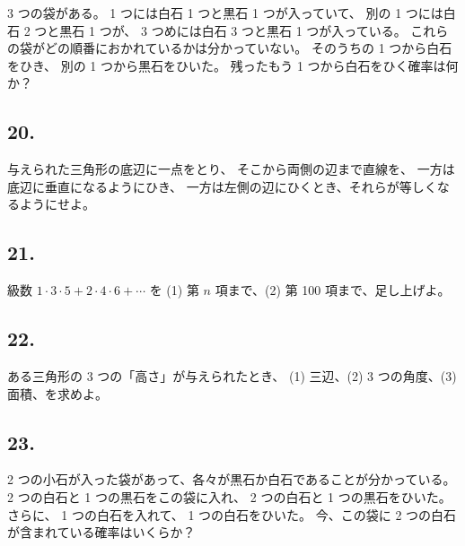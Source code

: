  3 つの袋がある。 1 つには白石 1 つと黒石 1 つが入っていて、
別の 1 つには白石 2 つと黒石 1 つが、
 3 つめには白石 3 つと黒石 1 つが入っている。
これらの袋がどの順番におかれているかは分かっていない。
そのうちの 1 つから白石をひき、
別の 1 つから黒石をひいた。
残ったもう 1 つから白石をひく確率は何か？

\subsection*{20.}

与えられた三角形の底辺に一点をとり、
そこから両側の辺まで直線を、
一方は底辺に垂直になるようにひき、
一方は左側の辺にひくとき、それらが等しくなるようにせよ。

\begin{flushright}
[5/88]
\end{flushright}

\subsection*{21.}

級数
$1 \cdot 3 \cdot 5 + 2 \cdot 4 \cdot 6 + \cdots$
を (1) 第 $n$ 項まで、(2) 第 100 項まで、足し上げよ。

\begin{flushright}
[7/4/89]
\end{flushright}

\subsection*{22.}

ある三角形の 3 つの「高さ」が与えられたとき、
(1) 三辺、(2)  3 つの角度、(3) 面積、を求めよ。

\begin{flushright}
[4/6/89]
\end{flushright}


\subsection*{23.}

 2 つの小石が入った袋があって、各々が黒石か白石であることが分かっている。
 2 つの白石と 1 つの黒石をこの袋に入れ、
 2 つの白石と 1 つの黒石をひいた。
さらに、 1 つの白石を入れて、
 1 つの白石をひいた。
今、この袋に 2 つの白石が含まれている確率はいくらか？

\begin{flushright}
[25/9/87]
\end{flushright}

